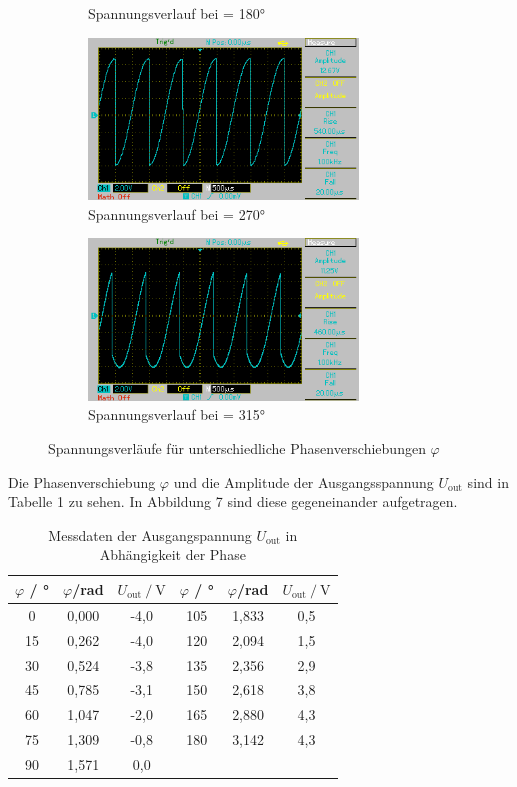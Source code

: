 \begin{figure}[H]
\begin{subfigure}{0.48\textwidth}
  \caption{Spannungsverlauf bei \varphi = 180°}
\end{subfigure}
\begin{subfigure}{0.48\textwidth}
  \centering
  \includegraphics[height=4.3cm]{MAP014.png}
  \caption{Spannungsverlauf bei \varphi = 270°}
\end{subfigure}
\begin{subfigure}{0.48\textwidth}
  \centering
  \includegraphics[height=4.3cm]{MAP015.png}
  \caption{Spannungsverlauf bei \varphi = 315°}
\end{subfigure}
\caption{Spannungsverläufe für unterschiedliche Phasenverschiebungen $\varphi$}
\label{fig:versuche}
\end{figure}

Die Phasenverschiebung $\varphi$ und die Amplitude der Ausgangsspannung $U_\text{out}$ 
sind in Tabelle 1 zu sehen. In Abbildung 7 sind diese gegeneinander aufgetragen.


\begin{table}[H]
\centering
\caption{Messdaten der Ausgangspannung $U_\text{out}$ in Abhängigkeit der Phase}
\label{tab:data2}
\begin{tabular}{c c c c c c}
\toprule
$\varphi$ \:/\: ° & $\varphi$\:/\:rad  & $U_\text{out} \:/\: \si{\volt}$ & $\varphi$ \:/\: ° & $\varphi$\:/\:rad   & $U_\text{out} \:/\: \si{\volt}$\\
\midrule
0  & 0,000 & -4,0 & 105 & 1,833 & 0,5 \\
15 & 0,262 & -4,0 & 120 & 2,094 & 1,5 \\
30 & 0,524 & -3,8 & 135 & 2,356 & 2,9 \\
45 & 0,785 & -3,1 & 150 & 2,618 & 3,8 \\
60 & 1,047 & -2,0 & 165 & 2,880 & 4,3 \\
75 & 1,309 & -0,8 & 180 & 3,142 & 4,3 \\
90 & 1,571 & 0,0 & & & \\
\bottomrule
\end{tabular}
\end{table}

